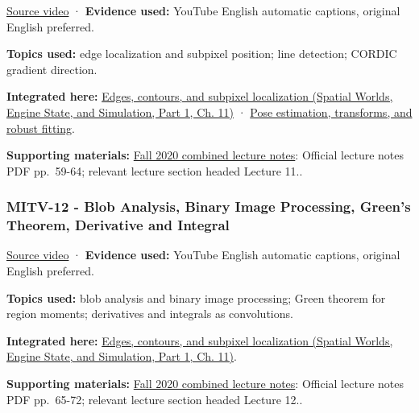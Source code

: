\hypertarget{04-visual-computing-ii-ch036-mitv-11---edge-detection-subpixel-position-cordic-line-detection-us-6408109}{}

\href{https://www.youtube.com/watch?v=kjCQ2DUn55Y}{Source video} · \textbf{Evidence used:} YouTube English automatic captions, original English preferred.

\textbf{Topics used:} edge localization and subpixel position; line detection; CORDIC gradient direction.

\textbf{Integrated here:} \href{../05-Spatial-Worlds-Engine-State-and-Simulation-P01/main.pdf\#nameddest=04-visual-computing-ii-ch030-edges-contours-and-subpixel-localization}{Edges, contours, and subpixel localization (Spatial Worlds, Engine State, and Simulation, Part 1, Ch. 11)} · \hyperref[04-visual-computing-ii-ch032-pose-estimation-transforms-and-robust-fitting]{Pose estimation, transforms, and robust fitting}.

\textbf{Supporting materials:} \href{https://ocw.mit.edu/courses/6-801-machine-vision-fall-2020/9ec44f69e72995c370b3797818ba01e6_MIT6_801F20_lectureNotes.pdf}{Fall 2020 combined lecture notes}: Official lecture notes PDF pp.~59-64; relevant lecture section headed Lecture 11..

\subsubsection{MITV-12 - Blob Analysis, Binary Image Processing, Green's Theorem, Derivative and Integral}\label{04-visual-computing-ii-ch036-mitv-12---blob-analysis-binary-image-processing-greens-theorem-derivative-and-integral}

\hypertarget{04-visual-computing-ii-ch036-mitv-12---blob-analysis-binary-image-processing-greens-theorem-derivative-and-integral}{}

\href{https://www.youtube.com/watch?v=jLvgNmGuxGk}{Source video} · \textbf{Evidence used:} YouTube English automatic captions, original English preferred.

\textbf{Topics used:} blob analysis and binary image processing; Green theorem for region moments; derivatives and integrals as convolutions.

\textbf{Integrated here:} \href{../05-Spatial-Worlds-Engine-State-and-Simulation-P01/main.pdf\#nameddest=04-visual-computing-ii-ch030-edges-contours-and-subpixel-localization}{Edges, contours, and subpixel localization (Spatial Worlds, Engine State, and Simulation, Part 1, Ch. 11)}.

\textbf{Supporting materials:} \href{https://ocw.mit.edu/courses/6-801-machine-vision-fall-2020/9ec44f69e72995c370b3797818ba01e6_MIT6_801F20_lectureNotes.pdf}{Fall 2020 combined lecture notes}: Official lecture notes PDF pp.~65-72; relevant lecture section headed Lecture 12..

